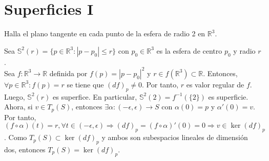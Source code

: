 \chapter{Superficies I}

\begin{ejr}[1]
  Halla el plano tangente en cada punto de la esfera de radio 2 en $\mathbb{R}^{3}$.
\end{ejr}

\begin{sol}
  Sea $\mathbb{S}^{2}(r) = \{ p \in \mathbb{R}^{3} : |p - p_{0}| \leq r \}$ con $p_{0} \in \mathbb{R}^{3}$ es la esfera de centro $p_{0}$ y radio $r$. \\

  Sea $f : \mathbb{R}^{3} \to \mathbb{R}$ definida por $f(p) = | p - p_{0} |^{2}$ y $r \in f(\mathbb{R}^{3}) \subset \mathbb{R}$. Entonces, $\forall p \in \mathbb{R}^{3} : f(p) = r$ se tiene que $(d f)_{p} \neq 0$. Por tanto, $r$ es valor regular de $f$. Luego, $\mathbb{S}^{2}(r)$ es superfice. En particular, $\mathbb{S}^{2}(2) = f^{-1}(\{ 2 \})$ es superficie. \\

  Ahora, si $v \in T_{p}(S)$, entonces $\exists \alpha : (-\epsilon, \epsilon) \to S$ con $\alpha(0) = p$ y $\alpha'(0) = v$. Por tanto, $(f \circ \alpha)(t) = r, \forall t \in (-\epsilon, \epsilon) \Rightarrow (d f)_{p} = (f \circ \alpha)'(0) = 0 \Rightarrow v \in \ker (d f)_{p}$. Como $T_{p}(S) \subset \ker (d f)_{p}$ y ambos son subespacios lineales de dimensión dos, entonces $T_{p}(S) = \ker (d f)_{p}$.
\end{sol}

